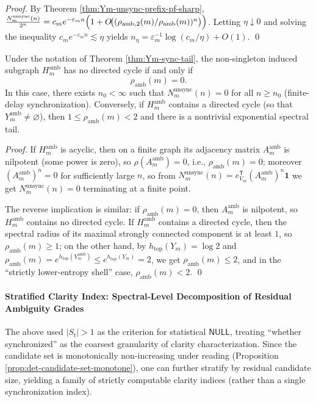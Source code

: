 \begin{proof}
By Theorem \ref{thm:Ym-unsync-prefix-pf-sharp},
\(
\frac{N_m^{\mathrm{unsync}}(n)}{2^n}
=c_m e^{-\varepsilon_m n}\Bigl(1+O\!\bigl((\rho_{\mathrm{amb},2}(m)/\rho_{\mathrm{amb}}(m))^{n}\bigr)\Bigr)
\).
Letting \(\eta\downarrow 0\) and solving the inequality \(c_m e^{-\varepsilon_m n}\lesssim \eta\) yields
\(
n_{\eta}=\varepsilon_m^{-1}\log(c_m/\eta)+O(1)
\).
\qed
\end{proof}

\begin{corollary}\label{cor:Ym-finite-delay-spectral-tail}
Under the notation of Theorem \ref{thm:Ym-sync-tail}, the non-singleton induced subgraph \(H_m^{\mathrm{amb}}\) has no directed cycle if and only if
\[
\rho_{\mathrm{amb}}(m)=0.
\]
In this case, there exists \(n_0<\infty\) such that \(N_m^{\mathrm{unsync}}(n)=0\) for all \(n\ge n_0\) (finite-delay synchronization).
Conversely, if \(H_m^{\mathrm{amb}}\) contains a directed cycle (so that \(Y_m^{\mathrm{amb}}\neq\varnothing\)), then \(1\le \rho_{\mathrm{amb}}(m)<2\) and there is a nontrivial exponential spectral tail.
\end{corollary}

\begin{proof}
If \(H_m^{\mathrm{amb}}\) is acyclic, then on a finite graph its adjacency matrix \(A_m^{\mathrm{amb}}\) is nilpotent (some power is zero), so \(\rho(A_m^{\mathrm{amb}})=0\), i.e., \(\rho_{\mathrm{amb}}(m)=0\); moreover \((A_m^{\mathrm{amb}})^n=0\) for sufficiently large \(n\), so from
\(
N_m^{\mathrm{unsync}}(n)=e_{V_m}^{\mathsf T}(A_m^{\mathrm{amb}})^n\mathbf 1
\)
we get \(N_m^{\mathrm{unsync}}(n)=0\) terminating at a finite point.
\par
The reverse implication is similar: if \(\rho_{\mathrm{amb}}(m)=0\), then \(A_m^{\mathrm{amb}}\) is nilpotent, so \(H_m^{\mathrm{amb}}\) contains no directed cycle.
If \(H_m^{\mathrm{amb}}\) contains a directed cycle, then the spectral radius of its maximal strongly connected component is at least \(1\), so \(\rho_{\mathrm{amb}}(m)\ge 1\); on the other hand, by \(h_{\mathrm{top}}(Y_m)=\log 2\) and \(\rho_{\mathrm{amb}}(m)=e^{h_{\mathrm{top}}(Y_m^{\mathrm{amb}})}\le e^{h_{\mathrm{top}}(Y_m)}=2\), we get \(\rho_{\mathrm{amb}}(m)\le 2\), and in the ``strictly lower-entropy shell'' case, \(\rho_{\mathrm{amb}}(m)<2\).
\qed
\end{proof}

\paragraph{Stratified Clarity Index: Spectral-Level Decomposition of Residual Ambiguity Grades}
The above used \(|S_t|>1\) as the criterion for statistical \(\mathsf{NULL}\), treating ``whether synchronized'' as the coarsest granularity of clarity characterization.
Since the candidate set is monotonically non-increasing under reading (Proposition \ref{prop:det-candidate-set-monotone}), one can further stratify by residual candidate size, yielding a family of strictly computable clarity indices (rather than a single synchronization index).

